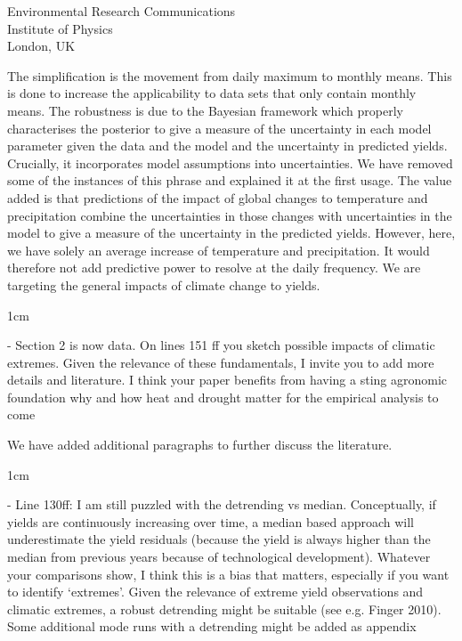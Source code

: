 \documentclass{letter}
\newcommand{\review}[1]{   
    \begin{adjustwidth}{1cm}{}
    \em{#1}
    \end{adjustwidth}
    }
\begin{document}
\begin{letter}{Environmental Research Communications \\ Institute of Physics \\ London, UK}
{}

The simplification is the movement from daily maximum to monthly means. This is done to increase the applicability to data sets that only contain monthly means. The robustness is due to the Bayesian framework which properly characterises the posterior to give a measure of the uncertainty in each model parameter given the data and the model and the uncertainty in predicted yields. Crucially, it incorporates model assumptions into uncertainties. We have removed some of the instances of this phrase and explained it at the first usage. The value added is that predictions of the impact of global changes to temperature and precipitation combine the uncertainties in those changes with uncertainties in the model to give a measure of the uncertainty in the predicted yields. However, here, we have solely an average increase of temperature and precipitation. It would therefore not add predictive power to resolve at the daily frequency. We are targeting the general impacts of climate change to yields.

\review{
- Section 2 is now data. On lines 151 ff you sketch possible impacts of climatic extremes. Given the relevance of these fundamentals, I invite you to add more details and literature. I think your paper benefits from having a sting agronomic foundation why and how heat and drought matter for the empirical analysis to come

}

We have added additional paragraphs to further discuss the literature. 

\review{
- Line 130ff: I am still puzzled with the detrending vs median. Conceptually, if yields are continuously increasing over time, a median based approach will underestimate the yield residuals (because the yield is always higher than the median from previous years because of technological development). Whatever your comparisons show, I think this is a bias that matters, especially if you want to identify ‘extremes’. Given the relevance of extreme yield observations and climatic extremes, a robust detrending might be suitable (see e.g. Finger 2010). Some additional mode runs with a detrending might be added as appendix

}


\end{letter}
\end{document}
